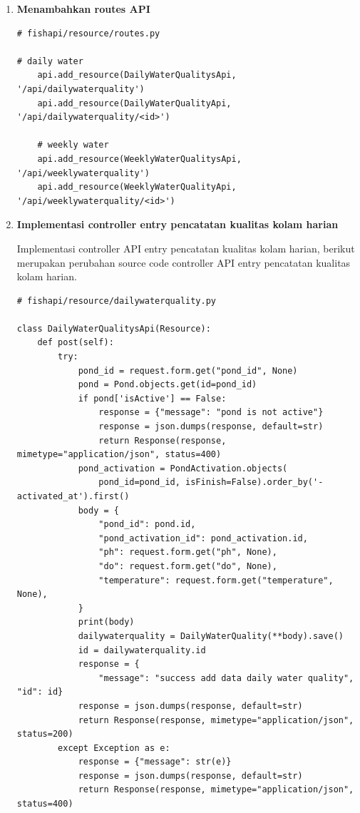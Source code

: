 \begin{enumerate}[1.]
\item \textbf{Menambahkan routes API}

\begin{lstlisting}
# fishapi/resource/routes.py

# daily water
    api.add_resource(DailyWaterQualitysApi, '/api/dailywaterquality')
    api.add_resource(DailyWaterQualityApi, '/api/dailywaterquality/<id>')

    # weekly water
    api.add_resource(WeeklyWaterQualitysApi, '/api/weeklywaterquality')
    api.add_resource(WeeklyWaterQualityApi, '/api/weeklywaterquality/<id>')
\end{lstlisting}




\item \textbf{Implementasi controller entry pencatatan kualitas kolam harian}

Implementasi controller API entry pencatatan kualitas kolam harian, berikut merupakan perubahan source code controller API entry pencatatan kualitas kolam harian.

\begin{lstlisting}
# fishapi/resource/dailywaterquality.py

class DailyWaterQualitysApi(Resource):
    def post(self):
        try:
            pond_id = request.form.get("pond_id", None)
            pond = Pond.objects.get(id=pond_id)
            if pond['isActive'] == False:
                response = {"message": "pond is not active"}
                response = json.dumps(response, default=str)
                return Response(response, mimetype="application/json", status=400)
            pond_activation = PondActivation.objects(
                pond_id=pond_id, isFinish=False).order_by('-activated_at').first()
            body = {
                "pond_id": pond.id,
                "pond_activation_id": pond_activation.id,
                "ph": request.form.get("ph", None),
                "do": request.form.get("do", None),
                "temperature": request.form.get("temperature", None),
            }
            print(body)
            dailywaterquality = DailyWaterQuality(**body).save()
            id = dailywaterquality.id
            response = {
                "message": "success add data daily water quality", "id": id}
            response = json.dumps(response, default=str)
            return Response(response, mimetype="application/json", status=200)
        except Exception as e:
            response = {"message": str(e)}
            response = json.dumps(response, default=str)
            return Response(response, mimetype="application/json", status=400)
\end{lstlisting}



\end{enumerate}
